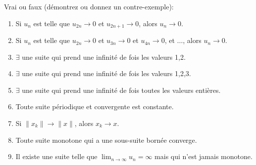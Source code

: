 
\begin{exercice}\label{exo0013}

Vrai ou faux (démontrez ou donnez un contre-exemple):
\begin{enumerate}
	\item\label{ItemAExo0013} Si $u_n$ est telle que $u_{2n}\rightarrow  0$ et $u_{2n+1}\rightarrow  0$,  alors $u_n\rightarrow  0$.
	\item Si $u_n$ est telle que $u_{2n}\rightarrow  0$ et $u_{3n}\rightarrow  0$ et $u_{4n}\rightarrow  0$, et $\ldots$,  alors $u_n\rightarrow  0$.
	\item $\exists$ une suite qui prend une infinité de fois les valeurs 1,2.
	\item $\exists$ une suite qui prend une infinité de fois les valeurs 1,2,3.
	\item\label{ItemEnumiE13} $\exists$ une suite qui prend une infinité de fois toutes les valeurs entières.
	\item Toute suite périodique et convergente est constante.
	\item Si  $\| x_k\| \to \| x \|$, alors $x_k\to x$.
	\item Toute suite monotone qui a une sous-suite bornée converge.
	\item Il existe une suite telle que $\lim_{n\rightarrow \infty}u_n = \infty$ mais qui n'est jamais monotone.
\end{enumerate}
\end{exercice}
